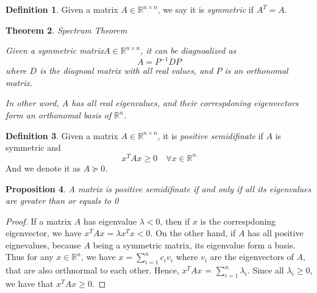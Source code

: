 \documentclass[12pt]{amsart}
\numberwithin{equation}{section}
\newtheorem{thm}{Theorem}
\newtheorem{prop}[thm]{Proposition}
\theoremstyle{definition}
\newtheorem{definition}[thm]{Definition}
\numberwithin{thm}{section}
\begin{document}
\begin{definition}
     Given a matrix $A \in \mathbb{R}^{n \times n}$, we say it is \emph{symmetric} if $A^T = A$.
\end{definition}


\begin{thm} Spectrum Theorem

     Given a symmetric matrix$A \in \mathbb{R}^{n \times n}$, it can be diagnoalized as \begin{equation} A = P^{-1}DP \end{equation} where $D$ is the diagnoal matrix with all real values, and $P$ is an orthonomal matrix.
     
     In other word, $A$ has all real eigenvalues, and their correspdoning eigenvectors form an orthonomal basis of $\mathbb{R}^n$.
     
\end{thm}


\begin{definition}
     Given a matrix $A \in \mathbb{R}^{n \times n}$, it is \emph{positive semidifinate} if $A$ is symmetric and \begin{equation}
          x^T A x \geq 0 \quad \forall x \in \mathbb{R}^n
     \end{equation}
     And we denote it as $A \succcurlyeq 0$.
\end{definition}

\begin{prop}
     A matrix is \emph{positive semidifinate} if and only if all its eigenvalues are greater than or equals to 0
\end{prop}

\begin{proof}
     If a matrix $A$ has eigenvalue $\lambda < 0$, then if $x$ is the correspdoning eigenvector, we have $x^T A x = \lambda x^T x < 0$.
     On the other hand, if $A$ has all positive eignevalues, because $A$ being a symmetric matrix, its eigenvalue form a basis. Thus for any $x \in \mathbb{R}^n$, we have
     $x = \sum_{i = 1} ^ n c_i v_i $ where $v_i$ are the eigenvectors of $A$, that are also orthnormal to each other.
     Hence, $x^T A x$ = $\sum_{i = 1} ^ n \lambda_i$. Since all $\lambda_i \geq 0$, we have that $x ^ T A x \geq 0$.

\end{proof}
\end{document}
